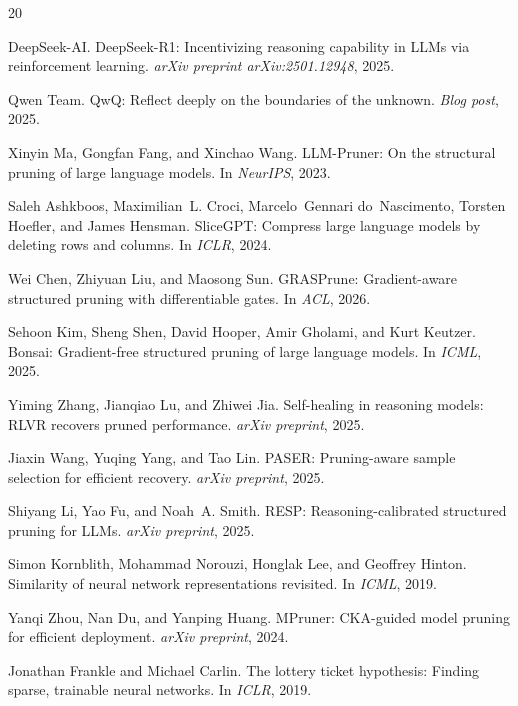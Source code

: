 \documentclass[11pt]{article}
\begin{document}
\begin{thebibliography}{20}

DeepSeek-AI.
\newblock DeepSeek-R1: Incentivizing reasoning capability in LLMs via reinforcement learning.
\newblock \emph{arXiv preprint arXiv:2501.12948}, 2025.

Qwen Team.
\newblock QwQ: Reflect deeply on the boundaries of the unknown.
\newblock \emph{Blog post}, 2025.

Xinyin Ma, Gongfan Fang, and Xinchao Wang.
\newblock LLM-Pruner: On the structural pruning of large language models.
\newblock In \emph{NeurIPS}, 2023.

Saleh Ashkboos, Maximilian~L. Croci, Marcelo~Gennari do~Nascimento, Torsten Hoefler, and James Hensman.
\newblock SliceGPT: Compress large language models by deleting rows and columns.
\newblock In \emph{ICLR}, 2024.

Wei Chen, Zhiyuan Liu, and Maosong Sun.
\newblock GRASPrune: Gradient-aware structured pruning with differentiable gates.
\newblock In \emph{ACL}, 2026.

Sehoon Kim, Sheng Shen, David Hooper, Amir Gholami, and Kurt Keutzer.
\newblock Bonsai: Gradient-free structured pruning of large language models.
\newblock In \emph{ICML}, 2025.

Yiming Zhang, Jianqiao Lu, and Zhiwei Jia.
\newblock Self-healing in reasoning models: RLVR recovers pruned performance.
\newblock \emph{arXiv preprint}, 2025.

Jiaxin Wang, Yuqing Yang, and Tao Lin.
\newblock PASER: Pruning-aware sample selection for efficient recovery.
\newblock \emph{arXiv preprint}, 2025.

Shiyang Li, Yao Fu, and Noah~A. Smith.
\newblock RESP: Reasoning-calibrated structured pruning for LLMs.
\newblock \emph{arXiv preprint}, 2025.

Simon Kornblith, Mohammad Norouzi, Honglak Lee, and Geoffrey Hinton.
\newblock Similarity of neural network representations revisited.
\newblock In \emph{ICML}, 2019.

Yanqi Zhou, Nan Du, and Yanping Huang.
\newblock MPruner: CKA-guided model pruning for efficient deployment.
\newblock \emph{arXiv preprint}, 2024.

Jonathan Frankle and Michael Carlin.
\newblock The lottery ticket hypothesis: Finding sparse, trainable neural networks.
\newblock In \emph{ICLR}, 2019.

\end{thebibliography}
\end{document}
